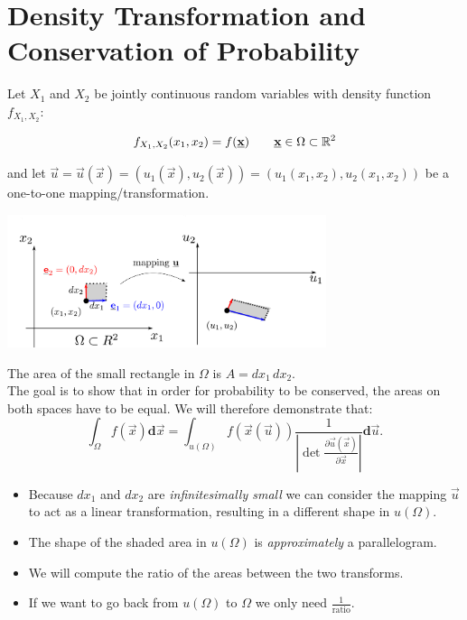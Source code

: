 \section{Density Transformation and Conservation of Probability}

Let $X_1$ and $X_2$ be jointly continuous random variables with 
density function $f_{X_1, X_2}$:

$$
f_{X_1, X_2}(x_1, x_2) = f(\underline{\mathbf{x}}) \qquad \underline{\mathbf{x}} \in \Omega \subset \mathbb{R}^2
$$

and let $\vec u = \vec u(\vec x) = ( u_1(\vec x), u_2(\vec x)) = ( u_1(x_1, x_2), u_2(x_1, x_2)) $ be a one-to-one mapping/transformation.

\includegraphics[width=0.7\textwidth]{img/u.pdf}

The area of the small rectangle in $\Omega$ is $A = dx_1\, dx_2$.\\

The goal is to show that in order for probability to be conserved, the areas on both spaces have to be equal. 
We will therefore demonstrate that:
$$
\int_{\Omega} f(\vec{x}) \mathbf{d}\vec{x}
=\int_{u(\Omega)} f({\vec x(\vec u)}) \frac{1}{\left|\det \frac{\partial \vec{u}(\vec{x})}{\partial \vec{x}} \right|} \mathbf{d}\vec{u}.
$$

\begin{itemize}
\item Because $dx_1$ and $dx_2$ are \emph{infinitesimally small} we can consider the mapping 
$\vec u$ to act as a linear transformation, resulting in a different shape in $u(\Omega)$. 
\item The shape of the shaded area in $u(\Omega)$ is \emph{approximately} a parallelogram.
\item We will compute the ratio of the areas between the two transforms.
\item If we want to go back from $u(\Omega)$ to $\Omega$ we only need $\frac{1}{\text{ratio}}$.
\end{itemize}

